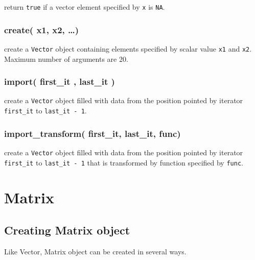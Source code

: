 \documentclass[]{book}
\theoremstyle{definition}
\theoremstyle{definition}
\theoremstyle{remark}
\begin{document}
return \texttt{true} if a vector element specified by \texttt{x} is
\texttt{NA}.

\subsection{create( x1, x2, \ldots{})}\label{create-x1-x2}

create a \texttt{Vector} object containing elements specified by scalar
value \texttt{x1} and \texttt{x2}. Maximum number of arguments are 20.

\subsection{import( first\_it , last\_it
)}\label{import-first_it-last_it}

create a \texttt{Vector} object filled with data from the position
pointed by iterator \texttt{first\_it} to \texttt{last\_it\ -\ 1}.

\subsection{import\_transform( first\_it, last\_it,
func)}\label{import_transform-first_it-last_it-func}

create a \texttt{Vector} object filled with data from the position
pointed by iterator \texttt{first\_it} to \texttt{last\_it\ -\ 1} that
is transformed by function specified by \texttt{func}.

\chapter{Matrix}\label{matrix}

\section{Creating Matrix object}\label{creating-matrix-object}

Like Vector, Matrix object can be created in several ways.
\end{document}
